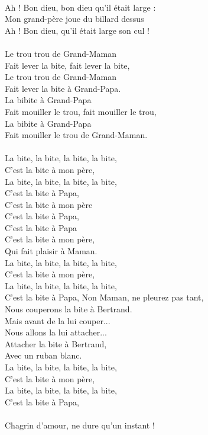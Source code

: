 \\Ah ! Bon dieu, bon dieu qu'il était large :
\\Mon grand-père joue du billard dessus
\\Ah ! Bon dieu, qu'il était large son cul !
\\\\Le trou trou de Grand-Maman
\\Fait lever la bite, fait lever la bite,
\\Le trou trou de Grand-Maman
\\Fait lever la bite à Grand-Papa.
\\La bibite à Grand-Papa
\\Fait mouiller le trou, fait mouiller le trou,
\\La bibite à Grand-Papa
\\Fait mouiller le trou de Grand-Maman.
\\\\La bite, la bite, la bite, la bite, 
\\C'est la bite à mon père,
\\La bite, la bite, la bite, la bite, 
\\C'est la bite à Papa,
\\C'est la bite à mon père
\\C'est la bite à Papa,
\\C'est la bite à Papa
\\C'est la bite à mon père,
\\Qui fait plaisir à Maman.
\\La bite, la bite, la bite, la bite,
\\C'est la bite à mon père,
\\La bite, la bite, la bite, la bite,
\\C'est la bite à Papa,
\breakpage
Non Maman, ne pleurez pas tant,
\\Nous couperons la bite à Bertrand.
\\Mais avant de la lui couper...
\\Nous allons la lui attacher...
\\Attacher la bite à Bertrand,
\\Avec un ruban blanc.
\\La bite, la bite, la bite, la bite, 
\\C'est la bite à mon père,
\\La bite, la bite, la bite, la bite, 
\\C'est la bite à Papa,
\\\\Chagrin d'amour, ne dure qu'un instant !
